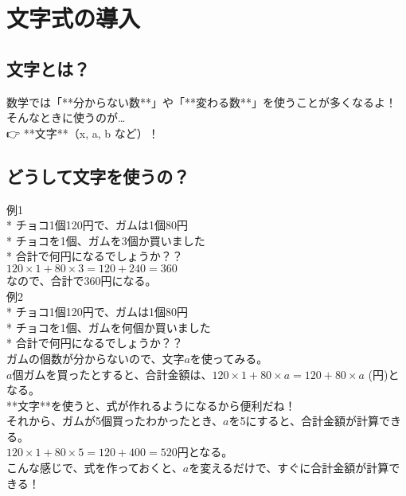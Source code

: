 \documentclass{jsarticle}
\begin{document}

\section{文字式の導入}


\subsection*{文字とは？}
数学では「**分からない数**」や「**変わる数**」を使うことが多くなるよ！\\

そんなときに使うのが…\\
👉 **文字**（x, a, b など）！


\subsection*{どうして文字を使うの？}

例1\\
* チョコ1個120円で、ガムは1個80円\\
* チョコを1個、ガムを3個か買いました\\
* 合計で何円になるでしょうか？？\\

$120 \times 1 + 80 \times 3 = 120 + 240 =360$\\
なので、合計で360円になる。\\

例2\\
* チョコ1個120円で、ガムは1個80円\\
* チョコを1個、ガムを何個か買いました\\
* 合計で何円になるでしょうか？？\\

ガムの個数が分からないので、文字$a$を使ってみる。\\
$a$個ガムを買ったとすると、合計金額は、$120 \times 1 + 80 \times a =120 + 80 \times a$ (円)となる。\\
**文字**を使うと、式が作れるようになるから便利だね！\\

それから、ガムが5個買ったわかったとき、$a$を5にすると、合計金額が計算できる。\\
$120 \times 1 + 80 \times 5 =120 + 400 = 520$円となる。\\

こんな感じで、式を作っておくと、$a$を変えるだけで、すぐに合計金額が計算できる！\\
\end{document}
